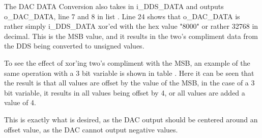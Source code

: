 The DAC DATA Conversion also takes in i\_DDS\_DATA and outputs o\_DAC\_DATA, line 7 and 8 in list . Line 24 shows that o\_DAC\_DATA is rather simply i\_DDS\_DATA xor'ed with the hex value "8000" or rather 32768 in decimal. This is the MSB value, and it results in the two's compliment data from the DDS being converted to unsigned values.

To see the effect of xor'ing two's compliment with the MSB, an example of the same operation with a 3 bit variable is shown in table . Here it can be seen that the result is that all values are offset by the value of the MSB, in the case of a 3 bit variable, it results in all values being offset by 4, or all values are added a value of 4. 

This is exactly what is desired, as the DAC output should be centered around an offset value, as the DAC cannot output negative values.

